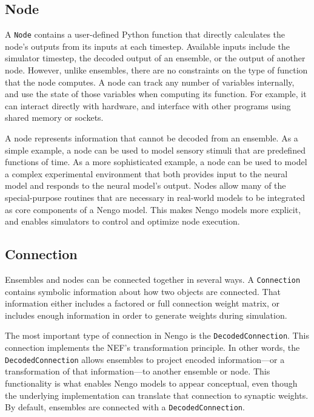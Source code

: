 \documentclass{frontiersSCNS}
\begin{document}
\subsection{Node}

A \texttt{Node} contains a user-defined
Python function that directly calculates
the node's outputs from its inputs at each timestep.
Available inputs include
the simulator timestep,
the decoded output of an ensemble,
or the output of another node.
However, unlike ensembles,
there are no constraints on the type
of function that the node computes.
A node can track any number of variables internally,
and use the state of those variables
when computing its function.
For example, it can interact directly with hardware,
and interface with other programs
using shared memory or sockets.

A node represents information
that cannot be decoded from an ensemble.
As a simple example,
a node can be used to model sensory stimuli
that are predefined functions of time.
As a more sophisticated example,
a node can be used to model
a complex experimental environment that
both provides input to the neural model
and responds to the neural model's output.
Nodes allow many of the special-purpose
routines that are necessary in real-world
models to be integrated
as core components of a Nengo model.
This makes Nengo models more explicit,
and enables simulators
to control and optimize node execution.

\subsection{Connection}

Ensembles and nodes can be connected together
in several ways.
A \texttt{Connection} contains symbolic information
about how two objects are connected.
That information either includes
a factored or full connection weight matrix,
or includes enough information
in order to generate weights during simulation.

The most important type of connection
in Nengo is the \texttt{DecodedConnection}.
This connection implements
the NEF's transformation principle.
In other words, the \texttt{DecodedConnection}
allows ensembles to project
encoded information---or
a transformation of that information---to
another ensemble or node.
This functionality is what enables Nengo models
to appear conceptual,
even though the underlying implementation
can translate that connection
to synaptic weights.
By default, ensembles are connected
with a \texttt{DecodedConnection}.
\end{document}
